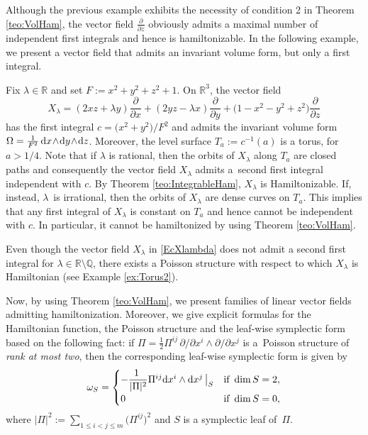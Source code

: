 \documentclass[10pt,a4paper]{amsart}
\newcommand{\R}[1]{\mathbb{R}^{#1}}
\newcommand{\dd}{{\rm d}}
\numberwithin{equation}{section}
\begin{document}
Although the previous example exhibits the necessity of condition 2 in Theorem \ref{teo:VolHam}, the vector field $\tfrac{\partial}{\partial z}$ obviously admits a maximal number of independent first integrals and hence is hamiltonizable. In the following example, we present a vector field that admits an invariant volume form, but only a first integral.

\begin{Example}\label{ex:Torus1}
Fix $\lambda \in \mathbb{R}$ and set $F:= x^2+y^2+z^2+1$. On $\R{3}$, the vector field
 \begin{equation}\label{EcXlambda}
 X_{\lambda} = (2xz+\lambda y)\frac{\partial}{\partial x} + (2yz-\lambda x)\frac{\partial}{\partial y} + \big(1-x^2-y^2+z^2\big)\frac{\partial}{\partial z}
 \end{equation}
has the first integral $c = \big(x^2\!+\!y^2\big)/F^2$ and admits the invariant volume form $\Omega = \frac{1}{F^2}\,\dd x \!\wedge \!\dd y \!\wedge\! \dd z$. Moreover, the level surface $T_{a} := c^{-1}(a)$ is a torus, for $a > 1/4$. Note that if $\lambda$ is rational, then the orbits of $X_{\lambda}$ along $T_{a}$ are closed paths and consequently the vector field $X_{\lambda}$ admits a~second first integral independent with $c$. By Theorem \ref{teo:IntegrableHam}, $X_\lambda$ is Hamiltonizable. If, instead, $\lambda$~is irrational, then the orbits of $X_{\lambda}$ are dense curves on $T_{a}$. This implies that any first integral of $X_{\lambda}$ is constant on $T_{a}$ and hence cannot be independent with $c$. In particular, it cannot be hamiltonized by using Theorem \ref{teo:VolHam}.
\end{Example}

\begin{Remark}
Even though the vector field $X_{\lambda}$ in \eqref{EcXlambda} does not admit a second first integral for $\lambda \in \mathbb{R} \setminus \mathbb{Q}$, there exists a Poisson structure with respect to which $X_{\lambda}$ is Hamiltonian (see Example \ref{ex:Torus2}).
\end{Remark}

Now, by using Theorem \ref{teo:VolHam}, we present families of linear vector fields admitting hamiltonization. Moreover, we give explicit formulas for the Hamiltonian function, the Poisson structure and the leaf-wise symplectic form based on the following fact: if $\Pi=\frac{1}{2}\Pi^{ij}\,\partial/\partial{x^{i}} \wedge \partial/\partial{x^{j}}$ is a~Poisson structure of \emph{rank at most two}, then the corresponding leaf-wise symplectic form is given by
 \begin{equation}\label{eq:FormaSimplect2}
 \omega_{S} =
 \begin{cases}
 -\dfrac{1\ }{|\Pi|^{2}} \Pi^{ij}\dd{x^{i}} \wedge \dd{x^{j}}\,\big|_{S} & \text{if} \  \dim{S} = 2, \\
 0 & \text{if} \ \dim{S} = 0,
 \end{cases}
 \end{equation}
where $|\Pi|^{2} := \sum_{1 \leq i < j \leq m}\big(\Pi^{ij}\big)^{2}$ and $S$ is a symplectic leaf of~$\Pi$.
\end{document}
